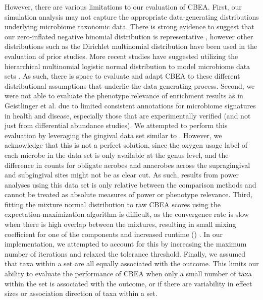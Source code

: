 However, there are various limitations to our evaluation of CBEA. First, our simulation analysis may not capture the appropriate data-generating distributions underlying microbiome taxonomic data. There is strong evidence to suggest that our zero-inflated negative binomial distribution is representative \cite{calgaro2020}, however other distributions such as the Dirichlet multinomial distribution \cite{wu2016a} have been used in the evaluation of prior studies. More recent studies have suggested utilizing the hierarchical multinomial logistic normal distribution to model microbiome data sets \cite{morton2021, ma2021a}. As such, there is space to evaluate and adapt CBEA to these different distributional assumptions that underlie the data generating process. Second, we were not able to evaluate the phenotype relevance of enrichment results as in Geistlinger et al. \cite{geistlinger2021} due to limited consistent annotations for microbiome signatures in health and disease, especially those that are experimentally verified (and not just from differential abundance studies). We attempted to perform this evaluation by leveraging the gingival data set similar to \cite{calgaro2020}. However, we acknowledge that this is not a perfect solution, since the oxygen usage label of each microbe in the data set is only available at the genus level, and the difference in counts for obligate aerobes and anaerobes across the supragingival and subgingival sites might not be as clear cut. As such, results from power analyses using this data set is only relative between the comparison methods and cannot be treated as absolute measures of power or phenotype relevance. Third, fitting the mixture normal distribution to raw CBEA scores using the expectation-maximization algorithm is difficult, as the convergence rate is slow when there is high overlap between the mixtures, resulting in small mixing coefficient for one of the components and increased runtime () \cite{naim2012}. In our implementation, we attempted to account for this by increasing the maximum number of iterations and relaxed the tolerance threshold. Finally, we assumed that taxa within a set are all equally associated with the outcome. This limits our ability to evaluate the performance of CBEA when only a small number of taxa within the set is associated with the outcome, or if there are variability in effect sizes or association direction of taxa within a set. 

